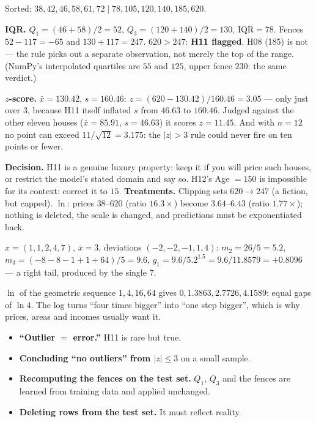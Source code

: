\documentclass[11pt]{article}
\newcommand{\IQR}{\mathrm{IQR}}
\begin{document}
\begin{worked}
Sorted: $38, 42, 46, 58, 61, 72 \mid 78, 105, 120, 140, 185, 620$.

\textbf{IQR.} $Q_1 = (46 + 58)/2 = 52$, $Q_3 = (120 + 140)/2 = 130$,
$\IQR = 78$. Fences $52 - 117 = -65$ and $130 + 117 = 247$. $620 > 247$:
\textbf{H11 flagged}. H08 (185) is not --- the rule picks out a separate
observation, not merely the top of the range. (NumPy's interpolated quartiles
are $55$ and $125$, upper fence $230$: the same verdict.)

\textbf{$z$-score.} $\bar x = 130.42$, $s = 160.46$:
$z = (620 - 130.42)/160.46 = 3.05$ --- only just over $3$, because H11 itself
inflated $s$ from $46.63$ to $160.46$. Judged against the other eleven houses
($\bar x = 85.91$, $s = 46.63$) it scores $z = 11.45$. And with $n = 12$ no
point can exceed $11/\sqrt{12} = 3.175$: the $|z| > 3$ rule could never fire
on ten points or fewer.

\textbf{Decision.} H11 is a genuine luxury property: keep it if you will price
such houses, or restrict the model's stated domain and say so. H12's Age $=
150$ is impossible for its context: correct it to $15$.
\textbf{Treatments.} Clipping sets $620 \to 247$ (a fiction, but capped).
$\ln$: prices $38$--$620$ (ratio $16.3\times$) become $3.64$--$6.43$
(ratio $1.77\times$); nothing is deleted, the scale is changed, and
predictions must be exponentiated back.
\end{worked}

\begin{worked}
$x = (1, 1, 2, 4, 7)$, $\bar x = 3$, deviations $(-2,-2,-1,1,4)$:
$m_2 = 26/5 = 5.2$, $m_3 = (-8 - 8 - 1 + 1 + 64)/5 = 9.6$,
$g_1 = 9.6/5.2^{1.5} = 9.6/11.8579 = +0.8096$ --- a right tail, produced by
the single $7$.

$\ln$ of the geometric sequence $1, 4, 16, 64$ gives $0, 1.3863, 2.7726,
4.1589$: equal gaps of $\ln 4$. The log turns ``four times bigger'' into
``one step bigger'', which is why prices, areas and incomes usually want it.
\end{worked}

\begin{caution}
\begin{itemize}
  \item \textbf{``Outlier $=$ error.''} H11 is rare but true.
  \item \textbf{Concluding ``no outliers'' from $|z| \le 3$} on a small sample.
  \item \textbf{Recomputing the fences on the test set.} $Q_1$, $Q_3$ and the
    fences are learned from training data and applied unchanged.
  \item \textbf{Deleting rows from the test set.} It must reflect reality.
\end{itemize}
\end{caution}
\end{document}

